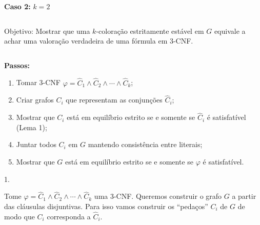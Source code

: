 \documentclass{beamer}
\newcommand{\cls}{\hat{C}}
\theoremstyle{plain}
\begin{document}
\begin{frame}
  \large\textbf{Caso 2:} $k=2$

  \normalsize
  \begin{columns}[t]
    \begin{column}{0.9\textwidth}
      \begin{block}{Objetivo:}
        Mostrar que uma $k$-coloração estritamente estável em $G$ equivale a achar uma valoração
        verdadeira de uma fórmula em 3-CNF\@.
      \end{block}
    \end{column}
  \end{columns}
  \vspace{0.2in}

  \textbf{Passos:}
  \begin{enumerate}
    \item Tomar 3-CNF $\varphi=\cls_1\wedge\cls_2\wedge \cdots\wedge\cls_k$;
    \item Criar grafos $C_i$ que representam as conjunções $\hat{C}_i$;
    \item Mostrar que $C_i$ está em equilíbrio estrito se e somente se $\hat{C}_i$ é satisfatível
      (Lema 1);
    \item Juntar todos $C_i$ em $G$ mantendo consistência entre literais;
    \item Mostrar que $G$ está em equilíbrio estrito se e somente se $\varphi$ é satisfatível.
  \end{enumerate}
\end{frame}

\begin{frame}

  {\color{blue} 1.}

  Tome $\varphi=\cls_1\wedge\cls_2\wedge\cdots\wedge\cls_k$ uma 3-CNF\@. Queremos construir o grafo
  $G$ a partir das cláusulas disjuntivas. Para isso vamos construir os ``pedaços'' $C_i$ de $G$ de
  modo que $C_i$ corresponda a $\cls_i$.
\end{frame}
\end{document}
